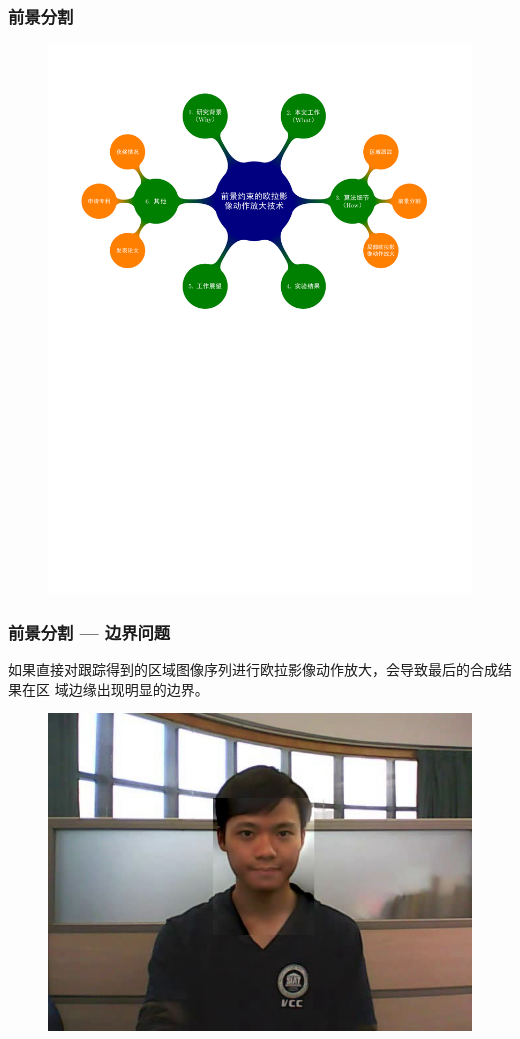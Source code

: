 \documentclass[xcolor=svgnames,serif,table,10pt]{beamer}
\begin{document}
\begin{frame}
  \frametitle{前景分割}
  \vspace{-2.5em}
  \begin{figure}
    \centering
    \includegraphics[width=\textwidth, page=6]{mindmap.pdf}
  \end{figure}
\end{frame}

\begin{frame}
  \frametitle{前景分割 --- 边界问题}

  如果直接对跟踪得到的区域图像序列进行欧拉影像动作放大，会导致最后的合成结果在区
  域边缘出现明显的边界。

  \begin{figure}[htbp]
    \centering
    \includegraphics[width=.5\textwidth]{bound-artifact.png}
  \end{figure}
\end{frame}
\end{document}
